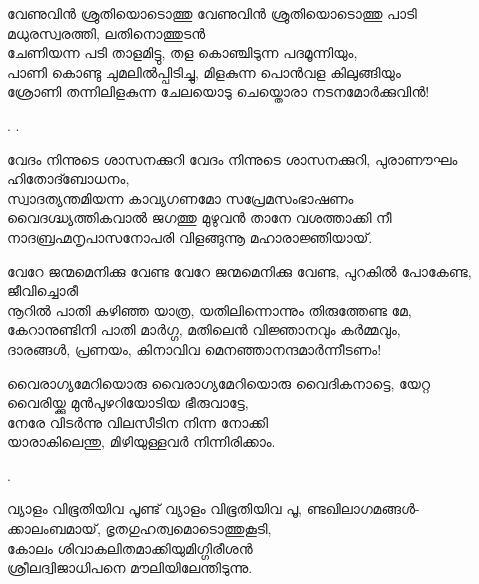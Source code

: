 \begin{enumerate}


\begin{slokam}{\VKm}{\CVVB}{വേണുവിൻ ശ്രുതിയൊടൊത്തു}
വേണുവിൻ ശ്രുതിയൊടൊത്തു പാടി മധുരസ്വരത്തി, ലതിനൊത്തുടൻ\\
ചേണിയന്ന പടി താളമിട്ടു, തള കൊഞ്ചിടുന്ന പദമൂന്നിയും,\\
പാണി കൊണ്ടു ചുമലിൽപ്പിടിച്ചു, മിളകുന്ന പൊൻവള കിലുങ്ങിയും\\
ശ്രോണി തന്നിലിളകുന്ന ചേലയൊടു ചെയ്തൊരാ നടനമോർക്കുവിൻ!
\end{slokam}


. 
.

\begin{slokam}{\VSv}{\VNM}{വേദം നിന്നുടെ ശാസനക്കുറി}
 വേദം നിന്നുടെ ശാസനക്കുറി, പുരാണൗഘം ഹിതോദ്ബോധനം,\\
സ്വാദത്യന്തമിയന്ന കാവ്യഗണമോ സപ്രേമസംഭാഷണം\\
വൈദഗ്ദ്ധ്യത്തികവാൽ ജഗത്തു മുഴുവൻ താനേ വശത്താക്കി നീ\\
നാദബ്രഹ്മനൃപാസനോപരി വിളങ്ങുന്നൂ മഹാരാജ്ഞിയായ്‌.
\end{slokam}



\begin{slokam}{\VSv}{\UN}{വേറേ ജന്മമെനിക്കു വേണ്ട}
വേറേ ജന്മമെനിക്കു വേണ്ട, പുറകിൽ പോകേണ്ട, ജീവിച്ചൊരീ\\
നൂറിൽ പാതി കഴിഞ്ഞ യാത്ര, യതിലിന്നൊന്നും തിരുത്തേണ്ട മേ,\\
കേറാനുണ്ടിനി പാതി മാർഗ്ഗ, മതിലെൻ വിജ്ഞാനവും കർമ്മവും,\\
ദാരങ്ങൾ, പ്രണയം, കിനാവിവ മെനഞ്ഞാനന്ദമാർന്നീടണം!
\end{slokam}



\begin{slokam}{\VVt}{\KA}{വൈരാഗ്യമേറിയൊരു}
 വൈരാഗ്യമേറിയൊരു വൈദികനാട്ടെ, യേറ്റ \\
വൈരിയ്ക്കു മുൻപുഴറിയോടിയ ഭീരുവാട്ടേ,\\
നേരേ വിടർന്നു വിലസീടിന നിന്ന നോക്കി\\
യാരാകിലെന്തു, മിഴിയുള്ളവർ നിന്നിരിക്കാം.
\end{slokam}


.

\begin{slokam}{\VVt}{\Ull}{വ്യാളം വിഭൂതിയിവ പൂണ്ട്}
 വ്യാളം വിഭൂതിയിവ പൂ, ണ്ടഖിലാഗമങ്ങള്‍-\\
ക്കാലംബമായ്‌, ഭൃതഗുഹത്വമൊടൊത്തുകൂടി,\\
കോലം ശിവാകലിതമാക്കിയുമിഗ്ഗിരീശൻ\\
ശ്രീലദ്വിജാധിപനെ മൗലിയിലേന്തിടുന്നു.
\end{slokam}


\end{enumerate}
